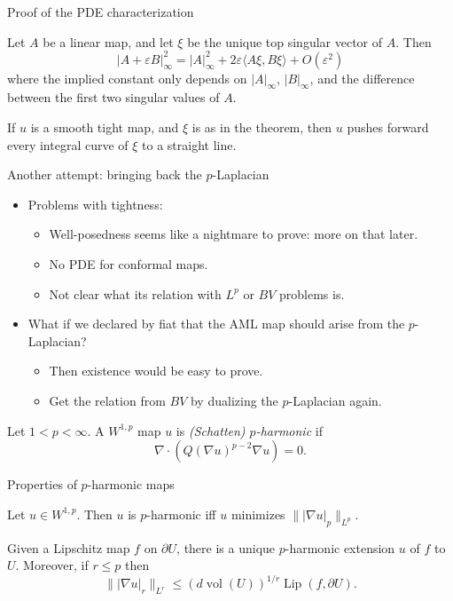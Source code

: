 \documentclass[10pt]{beamer}
\DeclareMathOperator{\Lip}{Lip}
\DeclareMathOperator{\vol}{vol}
\begin{document}
\begin{frame}{Proof of the PDE characterization}
\begin{lemma}
Let $A$ be a linear map, and let $\xi$ be the unique top singular vector of $A$. Then
$$|A + \varepsilon B|_\infty^2 = |A|_\infty^2 + 2\varepsilon \langle A\xi, B\xi\rangle + O(\varepsilon^2)$$
where the implied constant only depends on $|A|_\infty$, $|B|_\infty$, and the difference between the first two singular values of $A$. \pause
\end{lemma}

\begin{lemma}
If $u$ is a smooth tight map, and $\xi$ is as in the theorem, then $u$ pushes forward every integral curve of $\xi$ to a straight line.
\end{lemma}
\end{frame}

\begin{frame}{Another attempt: bringing back the $p$-Laplacian}
\begin{itemize}
\item Problems with tightness:
\begin{itemize}
\item Well-posedness seems like a nightmare to prove: more on that later.
\item No PDE for conformal maps.
\item Not clear what its relation with $L^p$ or $BV$ problems is. \pause
\end{itemize}
\item What if we declared by fiat that the AML map should arise from the $p$-Laplacian?
\begin{itemize}
\item Then existence would be easy to prove.
\item Get the relation from $BV$ by dualizing the $p$-Laplacian again. \pause
\end{itemize}
\end{itemize}

\begin{definition}
Let $1 < p < \infty$.
A $W^{1, p}$ map $u$ is \emph{(Schatten) $p$-harmonic} if
$$\nabla \cdot (Q(\nabla u)^{p - 2} \nabla u) = 0.$$
\end{definition}
\end{frame}

\begin{frame}{Properties of $p$-harmonic maps}
\begin{lemma}
Let $u \in W^{1, p}$. Then $u$ is $p$-harmonic iff $u$ minimizes $\||\nabla u|_p\|_{L^p}$. \pause
\end{lemma}

\begin{lemma}
Given a Lipschitz map $f$ on $\partial U$, there is a unique $p$-harmonic extension $u$ of $f$ to $U$.
Moreover, if $r \leq p$ then
$$\||\nabla u|_r\|_{L^r} \leq (d\vol(U))^{1/r} \Lip(f, \partial U).$$
\end{lemma}
    
\end{frame}
\end{document}
